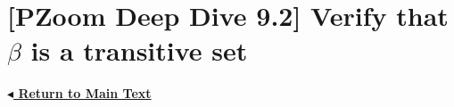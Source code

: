 \documentclass[11pt]{article}
\begin{document}
\pagestyle{empty} %

\section*{[PZoom Deep Dive 9.2] Verify that $\beta$ is a transitive set}

\vspace{0.8cm}
\noindent
\href{\pzbaseUrl/assets/pdfs/entry-0009/entry-0009-ordinals-part-i.pdf#body:entry-0009-2}{\textbf{\ensuremath{\blacktriangleleft} Return to Main Text}}
\end{document}

